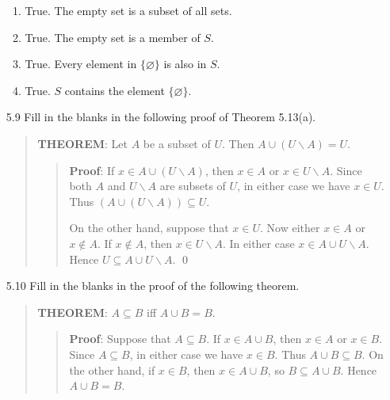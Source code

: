 \begin{enumerate}
      \begin{enumerate}
         \item True. The empty set is a subset of all sets.
         \item True. The empty set is a member of $S$.
         \item True. Every element in $\{\varnothing\}$ is also in $S$.
         \item True. $S$ contains the element $\{\varnothing\}$.
      \end{enumerate}
   \item[5.9]  Fill in the blanks in the following proof of Theorem 5.13(a).
               \begin{quote}
                  \textbf{THEOREM}: Let $A$ be a subset of $U$. Then
                  $A \cup (U{\backslash}A) = U$.
                  \begin{quote}
                     \textbf{Proof}: If $x \in A \cup (U{\backslash}A)$, then
                     $x \in A$ or $x \in U{\backslash}A$. Since both $A$ and
                     $U{\backslash}A$ are subsets of $U$, in either case we have
                     $x \in U$. Thus $(A \cup (U{\backslash}A)) \subseteq U$.

                     On the other hand, suppose that $x \in U$. Now either
                     $x \in A$ or $x \notin A$. If $x \notin A$, then
                     $x \in U{\backslash}A$. In either case
                     $x \in A \cup U{\backslash}A$. Hence
                     $U \subseteq A \cup U{\backslash}A$. \qed
                  \end{quote}
               \end{quote}
   \item[5.10] Fill in the blanks in the proof of the following theorem.
               \begin{quote}
                  \textbf{THEOREM}: $A \subseteq B$ iff $A \cup B = B$.
                  \begin{quote}
                     \textbf{Proof}: Suppose that $A \subseteq B$. If
                     $x \in A \cup B$, then $x \in A$ or $x \in B$. Since
                     $A \subseteq B$, in either case we have $x \in B$. Thus
                     $A \cup B \subseteq B$. On the other hand, if $x \in B$,
                     then $x \in A \cup B$, so $B \subseteq A \cup B$. Hence
                     $A \cup B = B$.


\end{quote}
\end{quote}
\end{enumerate}
